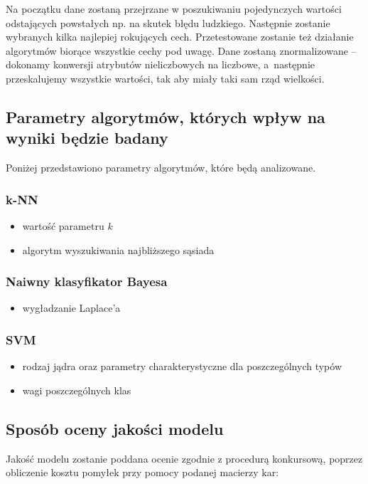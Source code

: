 \documentclass[a4paper, 12pt]{article}
\begin{document}
Na początku dane zostaną przejrzane w poszukiwaniu pojedynczych wartości odstających
powstałych np. na skutek błędu ludzkiego. Następnie zostanie wybranych kilka najlepiej rokujących
cech. Przetestowane zostanie też działanie algorytmów biorące wszystkie cechy pod uwagę.
Dane zostaną znormalizowane -- dokonamy konwersji atrybutów nieliczbowych na liczbowe,
a~następnie przeskalujemy wszystkie wartości, tak aby miały taki sam rząd wielkości.

\subsection{Parametry algorytmów, których wpływ na wyniki będzie badany}
Poniżej przedstawiono parametry algorytmów, które będą analizowane.

\subsubsection*{k-NN}
\begin{itemize}
	\item wartość parametru $k$
	\item algorytm wyszukiwania najbliższego sąsiada
\end{itemize}

\subsubsection*{Naiwny klasyfikator Bayesa}
\begin{itemize}
	\item wygładzanie Laplace'a
\end{itemize}

\subsubsection*{SVM}
\begin{itemize}
 \item rodzaj jądra oraz parametry charakterystyczne dla poszczególnych typów
 \item wagi poszczególnych klas
\end{itemize}

\subsection{Sposób oceny jakości modelu}
Jakość modelu zostanie poddana ocenie zgodnie z procedurą konkursową,
poprzez obliczenie kosztu pomyłek przy pomocy podanej macierzy kar:
\end{document}
